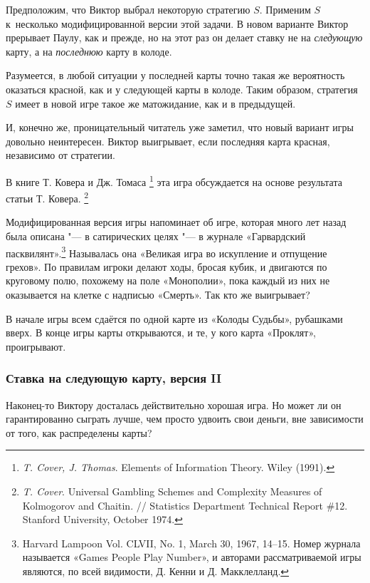\documentclass[twoside]{book}
\begin{document}
Предположим, что Виктор выбрал некоторую стратегию $S$.
Применим $S$ к~несколько модифицированной версии этой задачи.
В новом варианте Виктор прерывает Паулу, как и прежде, но на этот раз он делает ставку не на \emph{следующую} карту, а на \emph{последнюю} карту в колоде.

Разумеется, в любой ситуации у последней карты точно такая же вероятность оказаться красной, как и у следующей карты в колоде.
Таким образом, стратегия $S$ имеет в новой игре такое же матожидание, как и в предыдущей.

И, конечно же, проницательный читатель уже заметил, что новый вариант игры довольно неинтересен.
Виктор выигрывает, если последняя карта красная, независимо от стратегии.
\heart

В книге Т. Ковера и Дж. Томаса%
\footnote{\emph{T. Cover, J. Thomas}. {Elements of Information Theory}. Wiley (1991).} 
эта игра обсуждается на основе результата статьи Т. Ковера.%
\footnote{\emph{T. Cover}. Universal Gambling Schemes and Complexity Measures of Kolmogorov and Chaitin. /\!/ {Statistics Department Technical Report \#12}. Stanford University, October 1974.}

Модифицированная версия игры %
напоминает об игре, которая много лет назад была описана "--- в сатирических целях "--- в журнале «Гарвардский пасквилянт».\footnote{Harvard Lampoon Vol. CLVII, No. 1, March 30, 1967, 14--15.
Номер журнала называется «Games People Play Number», и авторами рассматриваемой игры являются, по всей видимости, Д. Кенни и Д. Макклелланд.%
}
Называлась она «Великая игра во искупление и отпущение грехов».
По правилам игроки делают ходы, бросая кубик, и двигаются по круговому полю, похожему на поле «Монополии», пока каждый из них не оказывается на клетке с надписью «Смерть».
Так кто же выигрывает?

В начале игры всем сдаётся по одной карте из «Колоды Судьбы», рубашками вверх.
В конце игры карты открываются, и те, у кого карта «Проклят», проигрывают.

\subsubsection*{Ставка на следующую карту, версия II}%

Наконец-то Виктору досталась действительно хорошая игра.
Но может ли он гарантированно сыграть лучше, чем просто удвоить свои деньги, вне зависимости от того, как распределены карты?
\end{document}
